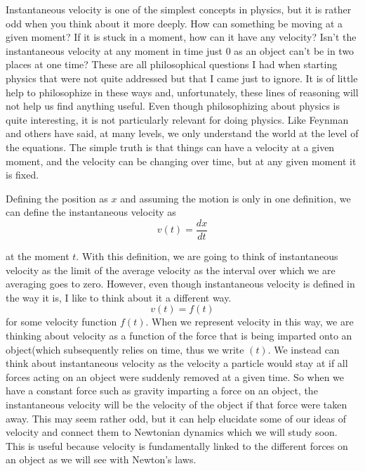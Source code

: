\documentclass{article}[gray]
\numberwithin{equation}{subsection}
\begin{document}
Instantaneous velocity is one of the simplest concepts in physics, but it is rather odd when you think about it more deeply. How can something be moving at a given moment? If it is stuck in a moment, how can it have any velocity? Isn't the instantaneous velocity at any moment in time just 0 as an object can't be in two places at one time? These are all philosophical questions I had when starting physics that were not quite addressed but that I came just to ignore. It is of little help to philosophize in these ways and, unfortunately, these lines of reasoning will not help us find anything useful. Even though philosophizing about physics is quite interesting, it is not particularly relevant for doing physics. Like Feynman and others have said, at many levels, we only understand the world at the level of the equations. The simple truth is that things can have a velocity at a given moment, and the velocity can be changing over time, but at any given moment it is fixed.
\vspace{5mm}
\\
\newline
Defining the position as $x$ and assuming the motion is only in one definition, we can define the instantaneous velocity as
\begin{equation} \label{eq:a}
v\left(t\right) = \frac{dx}{dt}\end{equation}

 at the moment $t$. With this definition, we are going to think of instantaneous velocity as the limit of the average velocity as the interval over which we are averaging goes to zero.  However, even though instantaneous velocity is defined in the way it is, I like to think about it a different way. $$
v\left(t\right) = f\left(t\right)$$ for some velocity function $f\left(t\right)$. When we represent velocity in this way, we are thinking about velocity as a function of the force that is being imparted onto an object(which subsequently relies on time, thus we write $\left(t\right)$. We instead can think about instantaneous velocity as the velocity a particle would stay at if all forces acting on an object were suddenly removed at a given time. So when we have a constant force such as gravity imparting a force on an object, the instantaneous velocity will be the velocity of the object if that force were taken away. This may seem rather odd, but it can help elucidate some of our ideas of velocity and connect them to Newtonian dynamics which we will study soon. This is useful because velocity is fundamentally linked to the different forces on an object as we will see with Newton's laws. 
\end{document}
